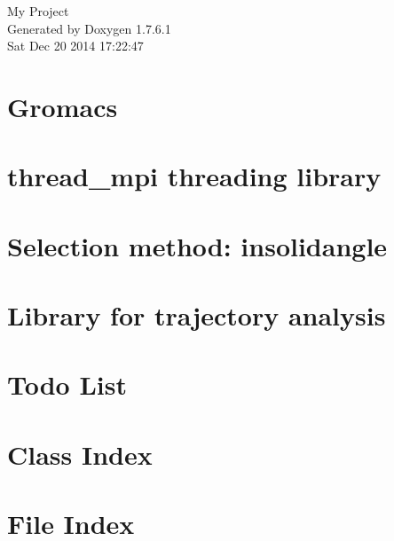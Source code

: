 \documentclass[a4paper]{book}
\begin{document}
\hypersetup{pageanchor=false,citecolor=blue}
\begin{titlepage}
\vspace*{7cm}
\begin{center}
{\Large \-My \-Project }\\
\vspace*{1cm}
{\large \-Generated by Doxygen 1.7.6.1}\\
\vspace*{0.5cm}
{\small Sat Dec 20 2014 17:22:47}\\
\end{center}
\end{titlepage}
\clearemptydoublepage
{}
\tableofcontents
\clearemptydoublepage
{}
\hypersetup{pageanchor=true,citecolor=blue}
\chapter{\-Gromacs}
\label{index}\hypertarget{index}{}
\chapter{thread\-\_\-mpi threading library}
\label{thread_mpi}
\hypertarget{thread_mpi}{}

\chapter{\-Selection method\-: insolidangle}
\label{sm_insolidangle}
\hypertarget{sm_insolidangle}{}

\chapter{\-Library for trajectory analysis}
\label{libtrajana}
\hypertarget{libtrajana}{}

\chapter{\-Todo \-List}
\label{todo}
\hypertarget{todo}{}

\chapter{\-Class \-Index}

\chapter{\-File \-Index}

\end{document}

